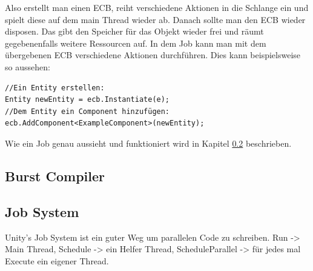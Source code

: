 \documentclass[12pt, titlepage]{article}
\DeclareRobustCommand{\#}{\adjustbox{valign=B,totalheight=.57\baselineskip}{\oldhash}}%
\begin{document}
Also erstellt man einen ECB, reiht verschiedene Aktionen in die Schlange ein und spielt diese auf dem main Thread wieder ab. Danach sollte man den ECB wieder disposen. Das gibt den Speicher für das Objekt wieder frei und räumt gegebenenfalls weitere Ressourcen auf. In dem Job kann man mit dem übergebenen ECB verschiedene Aktionen durchführen. Dies kann beispielsweise so aussehen:
\begin{lstlisting}[style=code, caption={ECB Aktionen Beispiel}]
//Ein Entity erstellen:
Entity newEntity = ecb.Instantiate(e);
//Dem Entity ein Component hinzufügen:
ecb.AddComponent<ExampleComponent>(newEntity);
\end{lstlisting}
Wie ein Job genau aussieht und funktioniert wird in Kapitel \ref{jobs} beschrieben.
\subsection{Burst Compiler} \label{burst}
\subsection{Job System} \label{jobs}
Unity's Job System ist ein guter Weg um parallelen Code zu schreiben.
Run -> Main Thread, Schedule -> ein Helfer Thread, ScheduleParallel -> für jedes mal Execute ein eigener Thread.
\newpage
\end{document}
